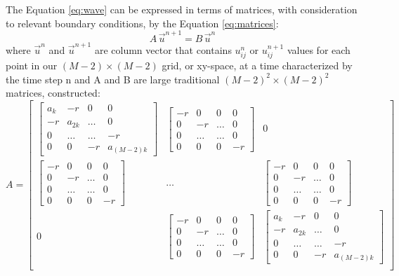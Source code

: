 \documentclass[10pt, nofootinbib, twocolumn]{revtex4-1}
\begin{document}
The Equation \eqref{eq:wave} can be expressed in terms of matrices, with consideration to relevant boundary conditions, by the Equation \eqref{eq:matrices}:
\begin{equation}\label{eq:matrices}
    A \,\vec{u}^{n+1} = B \,\vec{u}^{n}
\end{equation}
where $\vec{u}^n$ and  $\vec{u}^{n+1}$ are column vector that contains $u^n_{ij}$ or $u^{n+1}_{ij}$ values for each point in our $(M-2)\times (M-2)$ grid, or xy-space, at a time characterized by the time step n and A and B are large traditional $(M-2)^2\times (M-2)^2$  matrices, constructed:
\[
A = 
\begin{bmatrix}
    \begin{bmatrix}     a_{k} & -r & 0 & 0 \\     -r & a_{2k} & \ldots & 0 \\     0 & \ldots & \ldots & -r \\     0 & 0 & -r & a_{(M-2)k} \end{bmatrix} & \begin{bmatrix}     -r & 0 & 0 & 0 \\     0 & -r & \ldots & 0 \\     0 & \ldots & \ldots & 0 \\     0 & 0 & 0 &-r \end{bmatrix} & 0  \\
    \begin{bmatrix}     -r & 0 & 0 & 0 \\     0 & -r & \ldots & 0 \\     0 & \ldots & \ldots & 0 \\     0 & 0 & 0 &-r \end{bmatrix}  & \ldots & \begin{bmatrix}     -r & 0 & 0 & 0 \\     0 & -r & \ldots & 0 \\     0 & \ldots & \ldots & 0 \\     0 & 0 & 0 &-r \end{bmatrix}  \\
    0 & \begin{bmatrix}     -r & 0 & 0 & 0 \\     0 & -r & \ldots & 0 \\     0 & \ldots & \ldots & 0 \\     0 & 0 & 0 &-r \end{bmatrix} & \begin{bmatrix}     a_{k} & -r & 0 & 0 \\     -r & a_{2k} & \ldots & 0 \\     0 & \ldots & \ldots & -r \\     0 & 0 & -r & a_{(M-2)k} \end{bmatrix} \\
\end{bmatrix}
\]
\end{document}
